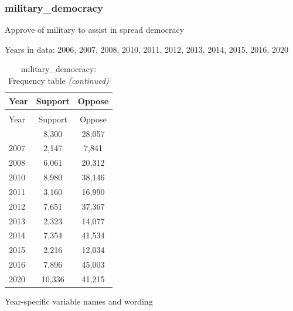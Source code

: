 \documentclass[
  12pt]{article}
\begin{document}
\hypertarget{military_democracy}{%
\subsubsection{military\_democracy}\label{military_democracy}}

Approve of military to assist in spread democracy

Years in data: 2006, 2007, 2008, 2010, 2011, 2012, 2013, 2014, 2015,
2016, 2020\begingroup\fontsize{10}{12}\selectfont

\begin{longtable}[t]{lcc}
\caption{\label{tab:unnamed-chunk-5}military\_democracy: Frequency table}\\
\toprule
Year & Support & Oppose\\
\midrule
\endfirsthead
\caption[]{military\_democracy: Frequency table \textit{(continued)}}\\
\toprule
Year & Support & Oppose\\
\midrule
\endhead

\endfoot
\bottomrule
\endlastfoot
2006 & 8,300 & 28,057\\
2007 & 2,147 & 7,841\\
2008 & 6,061 & 20,312\\
2010 & 8,980 & 38,146\\
2011 & 3,160 & 16,990\\
2012 & 7,651 & 37,367\\
2013 & 2,323 & 14,077\\
2014 & 7,354 & 41,534\\
2015 & 2,216 & 12,034\\
2016 & 7,896 & 45,003\\
2020 & 10,336 & 41,215\\*
\end{longtable}
\endgroup{}

Year-specific variable names and
wording\begingroup\fontsize{11}{13}\selectfont
\end{document}
